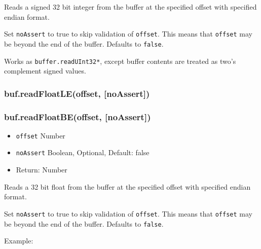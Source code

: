 Reads a signed 32 bit integer from the buffer at the specified offset
with specified endian format.

Set \texttt{noAssert} to true to skip validation of \texttt{offset}.
This means that \texttt{offset} may be beyond the end of the buffer.
Defaults to \texttt{false}.

Works as \texttt{buffer.readUInt32*}, except buffer contents are treated
as two's complement signed values.

\subsubsection{buf.readFloatLE(offset,
{[}noAssert{]})}\label{buf.readfloatleoffset-noassert}

\subsubsection{buf.readFloatBE(offset,
{[}noAssert{]})}\label{buf.readfloatbeoffset-noassert}

\begin{itemize}
\itemsep1pt\parskip0pt
\item
  \texttt{offset} Number
\item
  \texttt{noAssert} Boolean, Optional, Default: false
\item
  Return: Number
\end{itemize}

Reads a 32 bit float from the buffer at the specified offset with
specified endian format.

Set \texttt{noAssert} to true to skip validation of \texttt{offset}.
This means that \texttt{offset} may be beyond the end of the buffer.
Defaults to \texttt{false}.

Example:

\begin{Shaded}
\begin{Highlighting}[]
  \NormalTok{(}\NormalTok{);}

\NormalTok{buf[}\NormalTok{] = }\NormalTok{;}
\NormalTok{buf[}\NormalTok{] = }\NormalTok{;}
\NormalTok{buf[}\NormalTok{] = }\NormalTok{;}
\NormalTok{buf[}\NormalTok{] = }\NormalTok{;}

\NormalTok{(}\NormalTok{(}\NormalTok{));}

\end{Highlighting}
\end{Shaded}

